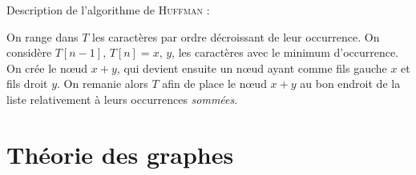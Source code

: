 \documentclass[a4paper, 8pt]{article}
\begin{document}
\begin{multicols*}{3}
Description de l'algorithme de \textsc{Huffman} :

On range dans $T$ les caractères par ordre décroissant de leur occurrence. On considère $T\left[n-1\right],\, T\left[n\right] = x,\,y$, les caractères avec le minimum d'occurrence. On crée le nœud $x+y$, qui devient ensuite un nœud ayant comme fils gauche $x$ et fils droit $y$. On remanie alors $T$ afin de place le nœud $x+y$ au bon endroit de la liste relativement à leurs occurrences \emph{sommées}.


\section*{Théorie des graphes}

\newcommand{\GXA}{$G = (X,A)$ }


\end{multicols*}
\end{document}
